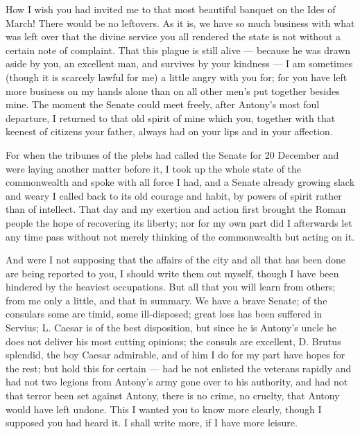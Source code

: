 

 How I wish you had invited me to that most beautiful banquet on the Ides of March! There would be no leftovers. As it is, we have so much business with what was left over that the divine service you all rendered the state is not without a certain note of complaint. That this plague is still alive --- because he was drawn aside by you, an excellent man, and survives by your kindness --- I am sometimes (though it is scarcely lawful for me) a little angry with you for; for you have left more business on my hands alone than on all other men's put together besides mine. The moment the Senate could meet freely, after Antony's most foul departure, I returned to that old spirit of mine which you, together with that keenest of citizens your father, always had on your lips and in your affection.

 For when the tribunes of the plebs had called the Senate for 20 December and were laying another matter before it, I took up the whole state of the commonwealth and spoke with all force I had, and a Senate already growing slack and weary I called back to its old courage and habit, by powers of spirit rather than of intellect. That day and my exertion and action first brought the Roman people the hope of recovering its liberty; nor for my own part did I afterwards let any time pass without not merely thinking of the commonwealth but acting on it.

 And were I not supposing that the affairs of the city and all that has been done are being reported to you, I should write them out myself, though I have been hindered by the heaviest occupations. But all that you will learn from others; from me only a little, and that in summary. We have a brave Senate; of the consulars some are timid, some ill-disposed; great loss has been suffered in Servius; L. Caesar is of the best disposition, but since he is Antony's uncle he does not deliver his most cutting opinions; the consuls are excellent, D. Brutus splendid, the boy Caesar admirable, and of him I do for my part have hopes for the rest; but hold this for certain --- had he not enlisted the veterans rapidly and had not two legions from Antony's army gone over to his authority, and had not that terror been set against Antony, there is no crime, no cruelty, that Antony would have left undone. This I wanted you to know more clearly, though I supposed you had heard it. I shall write more, if I have more leisure.
